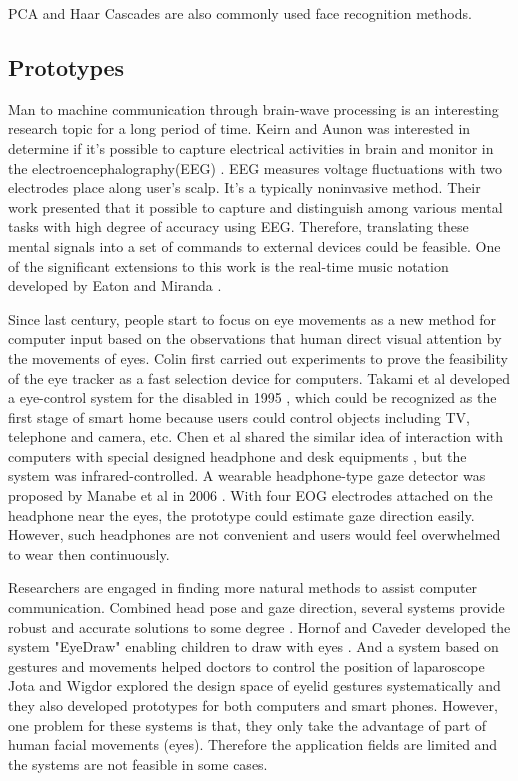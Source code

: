 \documentclass{sigchi}
\begin{document}
PCA \cite{arai2010camera} \cite{saragih2011deformable} and Haar Cascades \cite{parmar2012facial} \cite{gorodnichy2004nouse} are also commonly used face recognition methods.


\subsection{Prototypes}
Man to machine communication through brain-wave processing is an interesting research topic for a long period of time.
Keirn and Aunon was interested in determine if it's possible to capture electrical activities in brain and monitor in the electroencephalography(EEG) \cite{keirn1990man}.
EEG measures voltage fluctuations with two electrodes place along user's scalp.
It's a typically noninvasive method.
Their work presented that it possible to capture and distinguish among various mental tasks with high degree of accuracy using EEG.
Therefore, translating these mental signals into a set of commands to external devices could be feasible. 
One of the significant extensions to this work is the real-time music notation developed by Eaton and Miranda \cite{eaton2013real}. 

Since last century, people start to focus on eye movements as a new method for computer input based on the observations that human direct visual attention by the movements of eyes. 
Colin \cite{ware1987evaluation} first carried out experiments to prove the feasibility of the eye tracker as a fast selection device for computers.
Takami et al developed a eye-control system for the disabled in 1995 \cite{takami1995computer}, which could be recognized as the first stage of smart home because users could control objects including TV, telephone and camera, etc.
Chen et al shared the similar idea of interaction with computers with special designed headphone and desk equipments \cite{chen1999new}, but the system was infrared-controlled. 
A wearable headphone-type gaze detector was proposed by Manabe et al in 2006 \cite{manabe2006full}.
With four EOG electrodes attached on the headphone near the eyes, the prototype could estimate gaze direction easily.
However, such headphones are not convenient and users would feel overwhelmed to wear then continuously.

Researchers are engaged in finding more natural methods to assist computer communication.
Combined head pose and gaze direction, several systems provide robust and accurate solutions to some degree \cite{matsumoto2000algorithm} \cite{arai2010camera} \cite{takami1995computer} \cite{magee2004eyekeys}.
Hornof and Caveder developed the system "EyeDraw" enabling children to draw with eyes \cite{hornof2005eyedraw}.
And a system based on gestures and movements helped doctors to control the position of laparoscope \cite{nishikawa2003face} 
Jota and Wigdor explored the design space of eyelid gestures systematically \cite{jota2015palpebrae} and they also developed prototypes for both computers and smart phones.
However, one problem for these systems is that, they only take the advantage of part of human facial movements (eyes).
Therefore the application fields are limited and the systems are not feasible in some cases.
\end{document}
